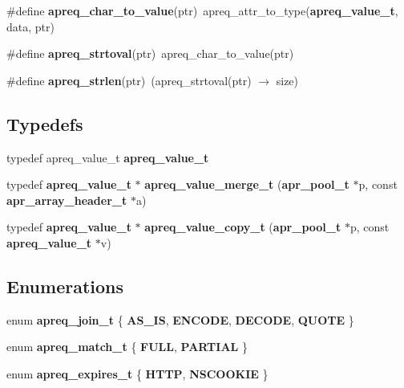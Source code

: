 \begin{CompactItemize}
\item 
\#define {\bf apreq\_\-char\_\-to\_\-value}(ptr)\ apreq\_\-attr\_\-to\_\-type({\bf apreq\_\-value\_\-t}, data, ptr)
\item 
{}
\#define {\bf apreq\_\-strtoval}(ptr)\ apreq\_\-char\_\-to\_\-value(ptr)\label{group__Utils_a34}

\item 
\#define {\bf apreq\_\-strlen}(ptr)\ (apreq\_\-strtoval(ptr) $\rightarrow$ size)
\end{CompactItemize}
\subsection*{Typedefs}
\begin{CompactItemize}
\item 
typedef apreq\_\-value\_\-t {\bf apreq\_\-value\_\-t}
\item 
{}
typedef {\bf apreq\_\-value\_\-t} $\ast$ {\bf apreq\_\-value\_\-merge\_\-t} ({\bf apr\_\-pool\_\-t} $\ast$p, const {\bf apr\_\-array\_\-header\_\-t} $\ast$a)\label{group__Utils_a1}

\item 
{}
typedef {\bf apreq\_\-value\_\-t} $\ast$ {\bf apreq\_\-value\_\-copy\_\-t} ({\bf apr\_\-pool\_\-t} $\ast$p, const {\bf apreq\_\-value\_\-t} $\ast$v)\label{group__Utils_a2}

\end{CompactItemize}
\subsection*{Enumerations}
\begin{CompactItemize}
\item 
enum {\bf apreq\_\-join\_\-t} \{ {\bf AS\_\-IS}, 
{\bf ENCODE}, 
{\bf DECODE}, 
{\bf QUOTE}
 \}
\item 
enum {\bf apreq\_\-match\_\-t} \{ {\bf FULL}, 
{\bf PARTIAL}
 \}
\item 
enum {\bf apreq\_\-expires\_\-t} \{ {\bf HTTP}, 
{\bf NSCOOKIE}
 \}
\end{CompactItemize}
